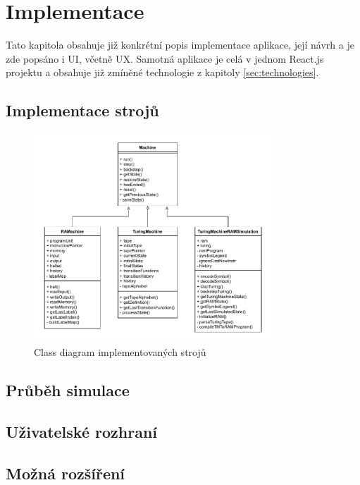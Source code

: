 \chapter{Implementace}
\label{sec:implementation}
Tato kapitola obsahuje již konkrétní popis implementace aplikace, její návrh a je zde popsáno i UI, včetně UX.
Samotná aplikace je celá v jednom React.js projektu a obsahuje již zmíněné technologie z kapitoly \ref{sec:technologies}.

\section{Implementace strojů}
\label{sec:machine_impl}


\begin{figure}[h!]
	\centering
	\includegraphics[width=0.8\textwidth]{Figures/class_diagram.pdf}
	\caption{Class diagram implementovaných strojů}
	\label{fig:class_machines}
\end{figure}

\section{Průběh simulace}

\section{Uživatelské rozhraní}

\section{Možná rozšíření}
